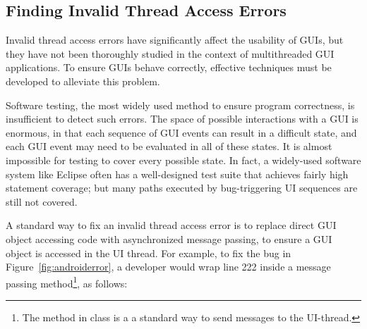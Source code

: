 


\subsection{Finding Invalid Thread Access Errors}
\label{sec:finding}

Invalid thread access errors have significantly affect the
usability of GUIs, but they have not been thoroughly studied in
the context of multithreaded GUI applications. To ensure GUIs
behave correctly, effective techniques must be developed to alleviate this problem.

Software testing, the most widely used method to ensure program correctness,
is insufficient to detect such errors. The space of possible interactions
with a GUI is enormous, in that each sequence of GUI events can result in
a difficult state, and each GUI event may need to be evaluated in all of
these states. It is almost impossible for testing to cover every possible
state. In fact, a widely-used software system like Eclipse
often has a well-designed test suite that achieves fairly high statement coverage;
but many paths executed by bug-triggering UI sequences are still not covered.



A standard way to fix an
invalid thread access error is to replace direct GUI object accessing code 
with asynchronized message passing, to ensure a GUI object is accessed in
the UI thread. For example, to fix the bug in Figure~\ref{fig:androiderror},
a developer would wrap line 222 inside a  message passing method\footnote{The
 method in class  is a
a standard way to send messages to the UI-thread.}, as follows:


